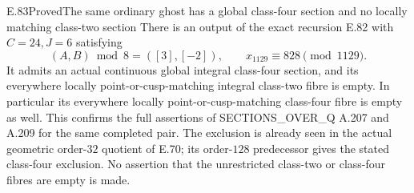 \begin{result}{E.83}{Proved}{The same ordinary ghost has a global class-four section and no locally matching class-two section}
There is an output of the exact recursion E.82 with $C=24,J=6$
satisfying
\[
 (A,B)\bmod8=([3],[-2]),\qquad
                         x_{1129}\equiv828\pmod{1129}.
 \tag{E.83.1}
\]
It admits an actual continuous global integral class-four section,
and its everywhere locally point-or-cusp-matching integral
class-two fibre is empty. In particular its everywhere locally
point-or-cusp-matching class-four fibre is empty as well.
This confirms the full assertions of SECTIONS\_OVER\_Q A.207
and A.209 for the same completed pair. The exclusion is already
seen in the actual geometric order-$32$ quotient of E.70;
its order-$128$ predecessor gives the stated class-four exclusion.
No assertion that the unrestricted class-two or class-four
fibres are empty is made.
\end{result}
